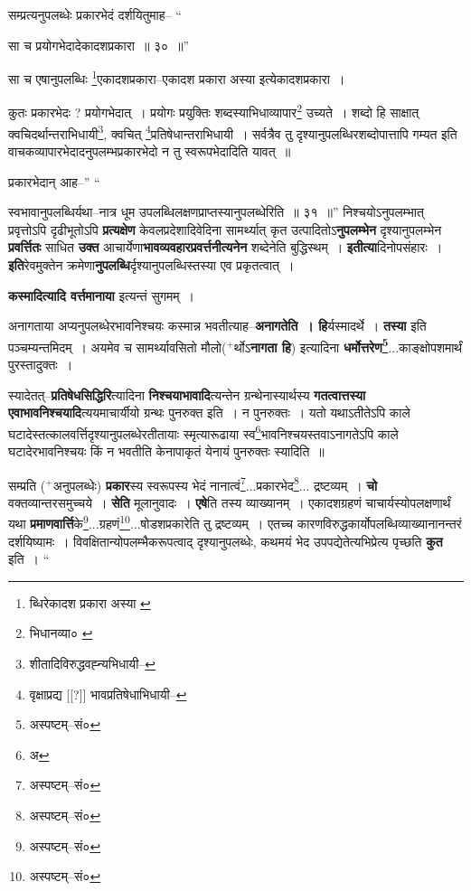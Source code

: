 \documentclass[article,12pt,a4paper]{memoir}
\newcommand{\add}[1]{($^{+}$#1)}
\begin{document}
	सम्प्रत्यनुपलब्धेः प्रकारभेदं दर्शयितुमाह-- “
	  
	सा च प्रयोगभेदादेकादशप्रकारा ॥ ३० ॥” 
	  
	सा च एषानुपलब्धिः \footnote{ब्धिरेकादश प्रकारा अस्या \cite{dp-msA} \cite{dp-edP} \cite{dp-edE}}एकादशप्रकारा--एकादश प्रकारा अस्या इत्येकादशप्रकारा । 
	  
	कुतः प्रकारभेदः ? प्रयोगभेदात् । प्रयोगः प्रयुक्तिः शब्दस्याभिधाव्यापार\footnote{भिधानव्या० \cite{dp-msA} \cite{dp-msB} \cite{dp-msC} \cite{dp-msD} \cite{dp-edP} \cite{dp-edH} \cite{dp-edE} \cite{dp-edN}} उच्यते । शब्दो हि साक्षात् क्वचिदर्थान्तराभिधायी\footnote{शीतादिविरुद्धवह्न्यभिधायी--\cite{dp-msD-n}}, क्वचित् \footnote{वृक्षाप्रद्य [[?]] भावप्रतिषेधाभिधायी--\cite{dp-msD-n}}प्रतिषेधान्तराभिधायी । सर्वत्रैव तु दृश्यानुपलब्धिरशब्दोपात्तापि गम्यत इति वाचकव्यापारभेदादनुपलम्भप्रकारभेदो न तु स्वरूपभेदादिति यावत् ॥ 
	  
	प्रकारभेदान् आह--” “
	  
	स्वभावानुपलब्धिर्यथा--नात्र धूम उपलब्धिलक्षणप्राप्तस्यानुपलब्धेरिति ॥ ३१ ॥” निश्चयोऽनुपलम्भात् प्रवृत्तोऽपि दृढीभूतोऽपि \textbf{प्रत्यक्षेण} केवलप्रदेशादिवेदिना सामर्थ्यात् कृत उत्पादितोऽ\textbf{नुपलम्भेन} दृश्यानुपलम्भेन \textbf{प्रवर्त्तितः} साधित \textbf{उक्त} आचार्येणा\textbf{भावव्यवहारप्रवर्त्तनीत्यनेन} शब्देनेति बुद्धिस्थम् । \textbf{इतीत्या}दिनोपसंहारः । \textbf{इति}रेवमुक्तेन क्रमेणा\textbf{नुपलब्धि}र्दृश्यानुपलब्धिस्तस्या एव प्रकृतत्वात् ।
	\pend
      

	  \pstart \textbf{कस्मादित्यादि वर्त्तमानाया} इत्यन्तं सुगमम् ।
	\pend
      

	  \pstart अनागताया अप्यनुपलब्धेरभावनिश्चयः कस्मान्न भवतीत्याह--\textbf{अनागतेति । हि}र्यस्मादर्थे । \textbf{तस्या} इति पञ्चम्यन्तमिदम् । अयमेव च सामर्थ्यावसितो मौलो\add{र्थोऽ\textbf{नागता हि}} इत्यादिना \textbf{धर्मोत्तरेण\footnote{अस्पष्टम्--सं०}}...काङ्क्षोपशमार्थं पुरस्तादुक्तः ।
	\pend
      

	  \pstart स्यादेतत्--\textbf{प्रतिषेधसिद्धिरि}त्यादिना \textbf{निश्चयाभावादि}त्यन्तेन \leavevmode{} ग्रन्थेनास्यार्थस्य \textbf{गतत्वात्तस्या एवाभावनिश्चयादि}त्ययमाचार्यीयो ग्रन्थः पुनरुक्त इति । न पुनरुक्तः । यतो यथाऽतीतेऽपि काले घटादेस्तत्कालवर्त्तिदृश्यानुपलब्धेरतीतायाः स्मृत्यारूढाया स्व\footnote{अ}भावनिश्चयस्तवाऽनागतेऽपि काले घटादेरभावनिश्चयः किं न भवतीति केनापाकृतं येनायं पुनरुक्तः स्यादिति ॥
	\pend
      

	  \pstart सम्प्रति \add{अनुपलब्धेः} \textbf{प्रकार}स्य स्वरूपस्य भेदं नानात्वं\footnote{अस्पष्टम्--सं०}...प्रकारभेद\footnote{अस्पष्टम्--सं०}... द्रष्टव्यम् । \textbf{चो} वक्तव्यान्तरसमुच्चये । \textbf{सेति} मूलानुवादः । \textbf{एषे}ति तस्य व्याख्यानम् । एकादशग्रहणं चाचार्यस्योपलक्षणार्थं यथा \textbf{प्रमाणवार्त्ति}के\footnote{अस्पष्टम्--सं०}...ग्रहणं\footnote{अस्पष्टम्--सं०}...षोडशप्रकारेति तु द्रष्टव्यम् । एतच्च कारणविरुद्धकार्योपलब्धिव्याख्यानानन्तरं दर्शयिष्यामः । विवक्षितान्योपलम्भैकरूपत्वाद् दृश्यानुपलब्धेः, कथमयं भेद उपपद्येतेत्यभिप्रेत्य पृच्छति \textbf{कुत} इति ।  \leavevmode{} “
	  
\end{document}
